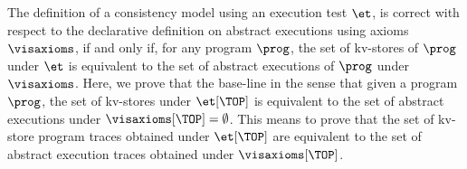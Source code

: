 The definition of a consistency model using an execution test \( \et \),
is correct with respect to the declarative definition on abstract executions
using axioms \( \visaxioms \),
if and only if, for any program \(\prog\), 
the set of kv-stores of \(\prog\) under \(\et\) 
is equivalent to the set of abstract executions of \(\prog\) under \(\visaxioms\).
Here, we prove that the base-line in the sense that
given a program \( \prog \), the set of kv-stores under  \( \et[\TOP] \)
is equivalent to the set of abstract executions under \( \visaxioms[\TOP] = \emptyset \).
This means to prove that 
the set of kv-store program traces obtained under \( \et[\TOP] \) are equivalent to 
the set of abstract execution traces obtained under \( \visaxioms[\TOP] \).

%




